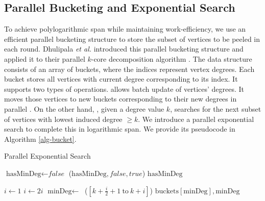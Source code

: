 \subsection{Parallel Bucketing and Exponential Search}
\label{sec:par-buckets}
To achieve polylogarithmic span while maintaining work-efficiency, we use an efficient parallel bucketing structure to store the subset of vertices to be peeled in each round. Dhulipala \textit{et al.} introduced this parallel bucketing structure and applied it to their parallel $k$-core decomposition algorithm \cite{DhBlSh17}. 
The data structure consists of an array of buckets, where the indices represent vertex degrees.
Each bucket stores all vertices with current degree corresponding to its index. It supports two types of operations.  allows batch update of vertices' degrees. It moves those vertices to new buckets corresponding to their new degrees in parallel \cite{DhBlSh17}. On the other hand, , given a degree value $k$, searches for the next subset of vertices with lowest induced degree $\ge k$. We introduce a parallel exponential search to complete this in logarithmic span. We provide its pseudocode in Algorithm \ref{alg-bucket}. 

\begin{algorithm}[t!]
 \footnotesize
\caption{Parallel Exponential Search}
 \begin{algorithmic}[1]
 
  
 \State $\text{hasMinDeg}\leftarrow \textit{false}$ 
 \State {}($\text{hasMinDeg}, \textit{false}, \textit{true}$) 
 \EndIf
 \EndParFor
 \State \Return $\text{hasMinDeg}$ 
 \EndProcedure
 
  
 \State $i\leftarrow 1$ \Comment{$i$ is doubled in each iteration of the while loop. In each iteration, we search interval $(\frac{i}{2},i]$ for the next nonempty bucket}
  \label{alg-next-bucket:start-while}
 \State $i\leftarrow 2i$
 \EndWhile \label{alg-next-bucket:end-while}
 \State $\text{minDeg}\leftarrow\ $ ($[k+\frac{i}{2}+1\ \text{to}\ k+i]$)
 \State \Return $\text{buckets}[\text{minDeg}], 
 \text{minDeg}$ 
 \EndProcedure
 
 \end{algorithmic}
 \label{alg-bucket}
\end{algorithm}

